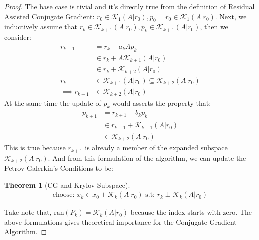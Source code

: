 \documentclass[]{article}
\theoremstyle{definition}
\newtheorem{theorem}{Theorem}  %
\begin{document}
            \begin{proof}
                The base case is tivial and it's directly true from the definition of Residual Assisted Conjugate Gradient: $r_0 \in \mathcal K_1(A|r_0), p_0 = r_0 \in \mathcal K_1(A|r_0)$. Next, we inductively assume that $r_k \in \mathcal K_{k + 1}(A|r_0), p_k \in \mathcal K_{k + 1}(A|r_0)$, then we consider: 
                \begin{align}
                    r_{k + 1} &= r_k - a_kAp_k
                    \\
                    &\in r_k + A\mathcal K_{k + 1}(A|r_0)
                    \\
                    &\in r_k + \mathcal K_{k + 2}(A|r_0)
                    \\
                    r_k 
                    &\in 
                    \mathcal K_{k + 1}(A|r_0) \subseteq \mathcal K_{k + 2}(A|r_0)
                    \\
                    \implies r_{k + 1}
                    &\in 
                    \mathcal K_{k + 2}(A|r_0)
                \end{align}
                At the same time the update of $p_k$ would asserts the property that: 
                \begin{align}
                    p_{k + 1} &= r_{k + 1} + b_kp_k
                    \\
                    &\in 
                    r_{k + 1} + \mathcal K_{k + 1}(A|r_0)
                    \\
                    &\in \mathcal K_{k + 2}(A|r_0)
                \end{align}
                This is true because $r_{k + 1}$ is already a member of the expanded subspace $\mathcal K_{k + 2}(A|r_0)$. And from this formulation of the algorithm, we can update the Petrov Galerkin's Conditions to be: 
                \begin{theorem}[CG and Krylov Subspace]\label{theorem:CG_and_Krylov_Subspace}
                    \begin{align}
                        \text{choose: } x_k\in x_0 + \mathcal K_{k}(A|r_0) \text{ s.t: } r_k \perp \mathcal K_{k}(A|r_0)
                    \end{align}    
                \end{theorem}
                Take note that, $\text{ran}(P_k) = \mathcal K_k(A|r_0)$ because the index starts with zero. The above formulations gives theoretical importance for the Conjugate Gradient Algorithm. 
            \end{proof}
\end{document}
